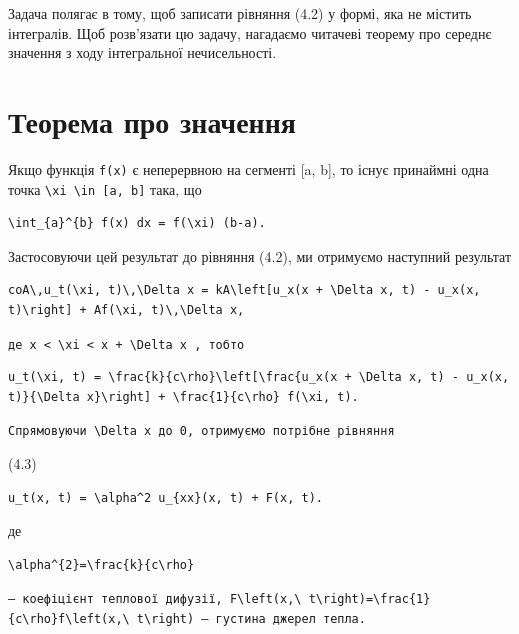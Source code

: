 \documentclass[
  ukrainian,
]{article}
\begin{document}
Задача полягає в тому, щоб записати рівняння (4.2) у формі, яка не
містить інтегралів. Щоб розв'язати цю задачу, нагадаємо читачеві теорему
про середнє значення з ходу інтегральної нечисельності.

\section{Теорема про
значення}\label{ux442ux435ux43eux440ux435ux43cux430-ux43fux440ux43e-ux437ux43dux430ux447ux435ux43dux43dux44f}

Якщо функція \texttt{f(x)} є неперервною на сегменті {[}a, b{]}, то
існує принаймні одна точка
\texttt{\textbackslash{}xi\ \textbackslash{}in\ {[}a,\ b{]}} така, що

\begin{verbatim}
\int_{a}^{b} f(x) dx = f(\xi) (b-a).
\end{verbatim}

Застосовуючи цей результат до рівняння (4.2), ми отримуємо наступний
результат

\begin{verbatim}
coA\,u_t(\xi, t)\,\Delta x = kA\left[u_x(x + \Delta x, t) - u_x(x, t)\right] + Af(\xi, t)\,\Delta x,
\end{verbatim}

\texttt{де\ \textquotesingle{}x\ \textless{}\ \textbackslash{}xi\ \textless{}\ x\ +\ \textbackslash{}Delta\ x\textquotesingle{}\ ,\ тобто}

\begin{verbatim}
u_t(\xi, t) = \frac{k}{c\rho}\left[\frac{u_x(x + \Delta x, t) - u_x(x, t)}{\Delta x}\right] + \frac{1}{c\rho} f(\xi, t).
\end{verbatim}

\texttt{Спрямовуючи\ \textquotesingle{}\textbackslash{}Delta\ x\textquotesingle{}\ до\ 0,\ отримуємо\ потрібне\ рівняння}

(4.3)

\begin{verbatim}
u_t(x, t) = \alpha^2 u_{xx}(x, t) + F(x, t).
\end{verbatim}

де

\begin{verbatim}
\alpha^{2}=\frac{k}{c\rho}
\end{verbatim}

\texttt{—\ коефіцієнт\ теплової\ дифузії,\ \textquotesingle{}F\textbackslash{}left(x,\textbackslash{}\ t\textbackslash{}right)=\textbackslash{}frac\{1\}\{c\textbackslash{}rho\}f\textbackslash{}left(x,\textbackslash{}\ t\textbackslash{}right)\textquotesingle{}\ —\ густина\ джерел\ тепла.}
\end{document}
